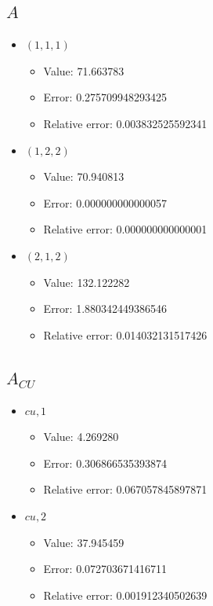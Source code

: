 \documentclass{article}%
\begin{document}
\subsection{$A$}%
\begin{itemize}%
	\item $(1, 1, 1)$%
	\begin{itemize}%
		\item Value: 71.663783%
		\item Error: 0.275709948293425%
		\item Relative error: 0.003832525592341%
	\end{itemize}%
	\item $(1, 2, 2)$%
	\begin{itemize}%
		\item Value: 70.940813%
		\item Error: 0.000000000000057%
		\item Relative error: 0.000000000000001%
	\end{itemize}%
	\item $(2, 1, 2)$%
	\begin{itemize}%
		\item Value: 132.122282%
		\item Error: 1.880342449386546%
		\item Relative error: 0.014032131517426%
	\end{itemize}%
\end{itemize}%
\subsection{$A_{CU}$}%
\begin{itemize}%
	\item $\textit{cu},1$%
	\begin{itemize}%
		\item Value: 4.269280%
		\item Error: 0.306866535393874%
		\item Relative error: 0.067057845897871%
	\end{itemize}%
	\item $\textit{cu},2$%
	\begin{itemize}%
		\item Value: 37.945459%
		\item Error: 0.072703671416711%
		\item Relative error: 0.001912340502639%
	\end{itemize}%
\end{itemize}%
\end{document}
